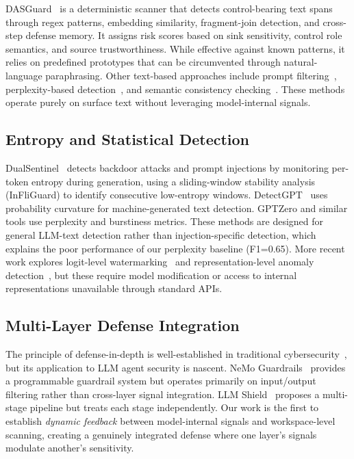 \documentclass[conference]{IEEEtran}
\begin{document}
DASGuard~\cite{zhan2024clawtrojan} is a deterministic scanner that detects control-bearing text spans through regex patterns, embedding similarity, fragment-join detection, and cross-step defense memory. It assigns risk scores based on sink sensitivity, control role semantics, and source trustworthiness. While effective against known patterns, it relies on predefined prototypes that can be circumvented through natural-language paraphrasing. Other text-based approaches include prompt filtering~\cite{wallace2024instruction}, perplexity-based detection~\cite{guo2023detectgpt}, and semantic consistency checking~\cite{jain2023baseline}. These methods operate purely on surface text without leveraging model-internal signals.

\subsection{Entropy and Statistical Detection}

DualSentinel~\cite{li2025dualsentinel} detects backdoor attacks and prompt injections by monitoring per-token entropy during generation, using a sliding-window stability analysis (InFliGuard) to identify consecutive low-entropy windows. DetectGPT~\cite{guo2023detectgpt} uses probability curvature for machine-generated text detection. GPTZero and similar tools use perplexity and burstiness metrics. These methods are designed for general LLM-text detection rather than injection-specific detection, which explains the poor performance of our perplexity baseline (F1=0.65). More recent work explores logit-level watermarking~\cite{kirchenbauer2023watermark} and representation-level anomaly detection~\cite{azaria2023internal}, but these require model modification or access to internal representations unavailable through standard APIs.

\subsection{Multi-Layer Defense Integration}

The principle of defense-in-depth is well-established in traditional cybersecurity~\cite{nist2023zerotrust}, but its application to LLM agent security is nascent. NeMo Guardrails~\cite{rebedea2023nemo} provides a programmable guardrail system but operates primarily on input/output filtering rather than cross-layer signal integration. LLM Shield~\cite{inspired2024llmshield} proposes a multi-stage pipeline but treats each stage independently. Our work is the first to establish \emph{dynamic feedback} between model-internal signals and workspace-level scanning, creating a genuinely integrated defense where one layer's signals modulate another's sensitivity.
\end{document}
